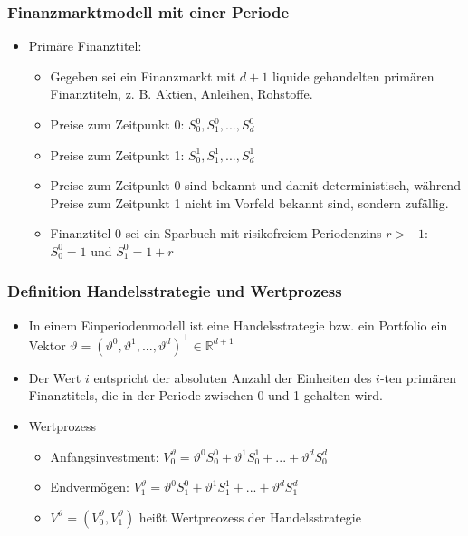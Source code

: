 \documentclass[12pt]{report}
\theoremstyle{dotless}
\theoremstyle{definition}
\begin{document}
\subsubsection{Finanzmarktmodell mit einer Periode}
\begin{itemize}
\item Primäre Finanztitel:
\begin{itemize}
\item Gegeben sei ein Finanzmarkt mit $d + 1$ liquide gehandelten primären
Finanztiteln, z. B. Aktien, Anleihen, Rohstoffe.
\item Preise zum Zeitpunkt 0: $S^0_0, S^0_1,...,S^0_d$
\item Preise zum Zeitpunkt 1: $S^1_0, S^1_1,..., S^1_d$
\item Preise zum Zeitpunkt 0 sind bekannt und damit deterministisch, während
Preise zum Zeitpunkt 1 nicht im Vorfeld bekannt sind, sondern zufällig.
\item Finanztitel 0 sei ein Sparbuch mit risikofreiem Periodenzins $r > -1$:\\
$S^0_0 = 1$ und $S_1^0 = 1+r$
\end{itemize}
\end{itemize}

\subsubsection{Definition Handelsstrategie und Wertprozess}

\begin{itemize}
\item In einem Einperiodenmodell ist eine Handelsstrategie bzw. ein Portfolio ein
Vektor $\vartheta = (\vartheta^0, \vartheta^1, ..., \vartheta^d)^\perp \in \mathbb{R}^{d+1}$
\item Der Wert $i$ entspricht der absoluten Anzahl der Einheiten des $i$-ten primären
Finanztitels, die in der Periode zwischen 0 und 1 gehalten wird.
\item Wertprozess
\begin{itemize}
\item Anfangsinvestment:  $V_0^\vartheta= \vartheta^0S^0_0 + \vartheta^1S_0^1 +...+\vartheta^dS_0^d$
\item Endvermögen: $V_1^\vartheta= \vartheta^0S^0_1 + \vartheta^1S_1^1 +...+\vartheta^dS_1^d$
\item $V^\vartheta = (V_0^\vartheta, V_1^\vartheta)$ heißt Wertpreozess der Handelsstrategie
\end{itemize}
\end{itemize}
\end{document}
